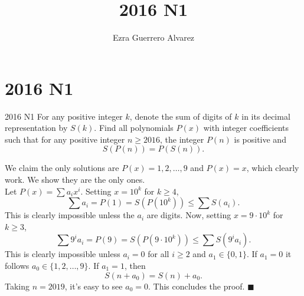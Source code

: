 \documentclass[14pt]{article}
\title{2016 N1}
\author{Ezra Guerrero Alvarez}
\begin{document}
\maketitle
	
\section*{2016 N1}

\begin{statement}{2016 N1}
	For any positive integer $k$, denote the sum of digits of $k$ in its decimal representation by $S(k)$. Find all polynomials $P(x)$ with integer coefficients such that for any positive integer $n \geq 2016$, the integer $P(n)$ is positive and
	\[ S(P(n)) = P(S(n)). \]
\end{statement}
We claim the only solutions are $P(x)=1,2,\ldots,9$ and $P(x)=x$, which clearly work. We show they are the only ones.\\
Let $P(x)=\sum a_ix^i$. Setting $x=10^k$ for $k\ge4$,
\[ \sum a_i=P(1)=S(P(10^k))\le\sum S(a_i). \]
This is clearly impossible unless the $a_i$ are digits. Now, setting $x=9\cdot 10^k$ for $k\ge 3$, 
\[ \sum 9^ia_i=P(9)=S(P(9\cdot10^k))\le\sum S(9^ia_i). \]
This is clearly impossible unless $a_i=0$ for all $i\ge2$ and $a_1\in\{0,1\}$. If $a_1=0$ it follows $a_0\in\{1,2,\ldots,9\}$. If $a_1=1$, then
\[ S(n+a_0)=S(n)+a_0. \]
Taking $n=2019$, it's easy to see $a_0=0$. This concludes the proof. $\blacksquare$
	
\end{document}
